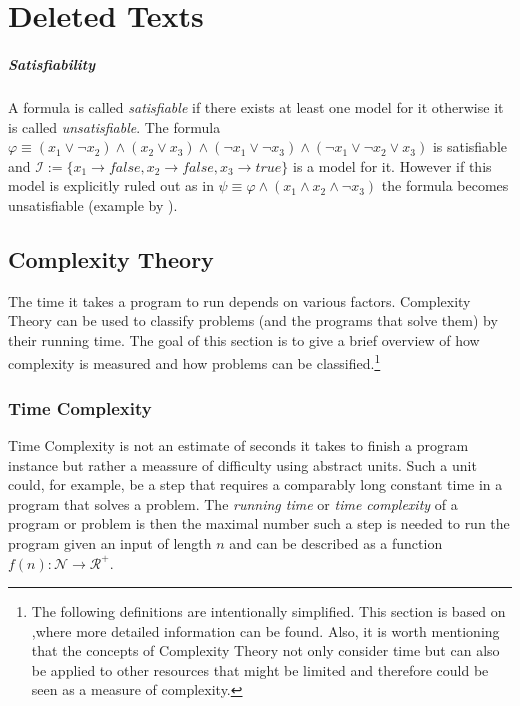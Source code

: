 \chapter{Deleted Texts} 

\paragraph{Satisfiability} \label{Satisfiability} A formula is called \emph{satisfiable} if there exists at least one model for it otherwise it is called \emph{unsatisfiable}. The formula $\varphi \equiv (x_1 \lor \neg x_2) \land (x_2 \lor x_3) \land (\neg x_1 \lor \neg x_3) \land (\neg x_1 \lor \neg x_2 \lor x_3)$ is satisfiable and $\mathcal{I}:= \{x_1 \rightarrow false, x_2 \rightarrow false, x_3 \rightarrow true\}$ is a model for it. However if this model is explicitly ruled out as in $\psi \equiv \varphi \land (x_1 \land x_2 \land \neg x_3)$ the formula becomes unsatisfiable (example by \cite{10.5555/1121689}).


\section{Complexity Theory}
The time it takes a program to run depends on various factors. Complexity Theory can be used to classify problems (and the programs that solve them) by their running time. The goal of this section is to give a brief overview of how complexity is measured and how problems can be classified.\footnote{The following definitions are intentionally simplified. This section is based on \cite{IntroductionToTheTheoryOfComputation},where more detailed information can be found. Also, it is worth mentioning that the concepts of Complexity Theory not only consider time but can also be applied to other resources that might be limited and therefore could be seen as a measure of complexity.}

\subsection{Time Complexity}\label{TimeComplexity}
Time Complexity is not an estimate of seconds it takes to finish a program instance but rather a meassure of difficulty using abstract units. Such a unit could, for example, be a step that requires a comparably long constant time in a program that solves a problem. The \emph{running time} or \emph{time complexity} of a program or problem is then the maximal number such a step is needed to run the program given an input of length $n$ and can be described as a function $f(n): \mathcal{N} \rightarrow \mathcal{R}^+$. 

